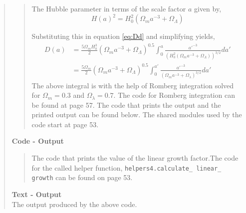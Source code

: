 \begin{quote}
\begin{quote}
The Hubble parameter in terms of the scale factor $a$ given by,
\begin{equation}
H(a)^2 = H_0^2 ( \Omega_m a^{-3} + \Omega_{\Lambda} )
\end{equation}

Substituting  this in equation \ref{eq:Dd} and simplifying yields,
\begin{align}
D(a) &= \frac{5 \Omega_m H_0^3}{2} ( \Omega_m a^{-3} + \Omega_{\Lambda} )^{0.5} \int_0^{a} \frac{a'^{-3}}{\left(H_0^2( \Omega_m a^{-3} + \Omega_{\Lambda} ) \right)^{3/2}} da' \\
&= \frac{5 \Omega_m}{2}  ( \Omega_m a^{-3} + \Omega_{\Lambda} )^{0.5} \int_0^{a'} \frac{a'^{-3}}{\left(\Omega_m a^{-3} + \Omega_{\lambda}\right)^{3/2}} da'
\label{EQ:Stuffffff}
\end{align}
The above integral is with the help of Romberg integration solved for $\Omega_{m} =0.3$ and $\Omega_{\lambda} = 0.7$.  The code for Romberg integration can be found at page 57.  The code that prints the output and the printed output can be found below. The shared modules used by the code start at page 53. %
\end{quote}

\textbf{Code - Output}
\begin{quote}
The code that prints the value of the linear growth factor.The code for the called helper function, \texttt{helpers4.calculate\_ linear\_ growth} can be found on page 53.

\end{quote}

\textbf{Text - Output} \\

The output produced by the above code.
\begin{quote}

\end{quote}

\end{quote}





